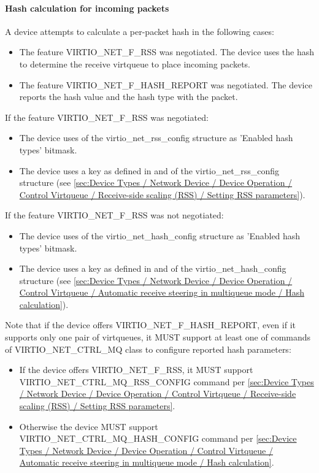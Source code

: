 \paragraph{Hash calculation for incoming packets}
\label{sec:Device Types / Network Device / Device Operation / Processing of Incoming Packets / Hash calculation for incoming packets}

A device attempts to calculate a per-packet hash in the following cases:
\begin{itemize}
\item The feature VIRTIO_NET_F_RSS was negotiated. The device uses the hash to determine the receive virtqueue to place incoming packets.
\item The feature VIRTIO_NET_F_HASH_REPORT was negotiated. The device reports the hash value and the hash type with the packet.
\end{itemize}

If the feature VIRTIO_NET_F_RSS was negotiated:
\begin{itemize}
\item The device uses  of the virtio_net_rss_config structure as 'Enabled hash types' bitmask.
\item The device uses a key as defined in  and  of the virtio_net_rss_config structure (see
\ref{sec:Device Types / Network Device / Device Operation / Control Virtqueue / Receive-side scaling (RSS) / Setting RSS parameters}).
\end{itemize}

If the feature VIRTIO_NET_F_RSS was not negotiated:
\begin{itemize}
\item The device uses  of the virtio_net_hash_config structure as 'Enabled hash types' bitmask.
\item The device uses a key as defined in  and  of the virtio_net_hash_config structure (see
\ref{sec:Device Types / Network Device / Device Operation / Control Virtqueue / Automatic receive steering in multiqueue mode / Hash calculation}).
\end{itemize}

Note that if the device offers VIRTIO_NET_F_HASH_REPORT, even if it supports only one pair of virtqueues, it MUST support
at least one of commands of VIRTIO_NET_CTRL_MQ class to configure reported hash parameters:
\begin{itemize}
\item If the device offers VIRTIO_NET_F_RSS, it MUST support VIRTIO_NET_CTRL_MQ_RSS_CONFIG command per
 \ref{sec:Device Types / Network Device / Device Operation / Control Virtqueue / Receive-side scaling (RSS) / Setting RSS parameters}.
\item Otherwise the device MUST support VIRTIO_NET_CTRL_MQ_HASH_CONFIG command per
 \ref{sec:Device Types / Network Device / Device Operation / Control Virtqueue / Automatic receive steering in multiqueue mode / Hash calculation}.
\end{itemize}

